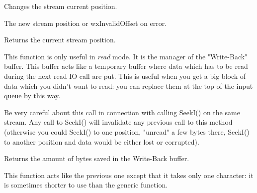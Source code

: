 Changes the stream current position.





The new stream position or wxInvalidOffset on error.

\label{wxinputstreamtelli}


Returns the current stream position.

\label{wxinputstreamungetch}


This function is only useful in {\it read} mode. It is the manager of the "Write-Back"
buffer. This buffer acts like a temporary buffer where data which has to be
read during the next read IO call are put. This is useful when you get a big
block of data which you didn't want to read: you can replace them at the top
of the input queue by this way.

Be very careful about this call in connection with calling SeekI() on the same
stream. Any call to SeekI() will invalidate any previous call to this method
(otherwise you could SeekI() to one position, "unread" a few bytes there, SeekI()
to another position and data would be either lost or corrupted).


Returns the amount of bytes saved in the Write-Back buffer.


This function acts like the previous one except that it takes only one
character: it is sometimes shorter to use than the generic function.

